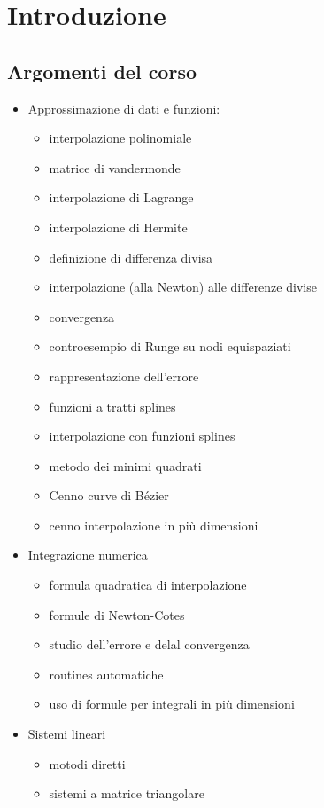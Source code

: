 \chapter{Introduzione}
\section{Argomenti del corso}
\begin{itemize}
  \item Approssimazione di dati e funzioni:
  \begin{itemize}
    \item interpolazione polinomiale
    \item matrice di vandermonde
    \item interpolazione di Lagrange
    \item interpolazione di Hermite
    \item definizione di differenza divisa
    \item interpolazione (alla Newton) alle differenze divise
    \item convergenza
    \item controesempio di Runge su nodi equispaziati
    \item rappresentazione dell'errore
    \item funzioni a tratti splines
    \item interpolazione con funzioni splines
    \item metodo dei minimi quadrati 
    \item Cenno curve di Bézier
    \item cenno interpolazione in più dimensioni
  \end{itemize}
  \item Integrazione numerica
  \begin{itemize}
    \item formula quadratica di interpolazione
    \item formule di Newton-Cotes
    \item studio dell'errore e delal convergenza
    \item routines automatiche
    \item uso di formule per integrali in più dimensioni
  \end{itemize}
  \item Sistemi lineari
  \begin{itemize}
    \item motodi diretti
    \item sistemi a matrice triangolare

\end{itemize}
\end{itemize}
